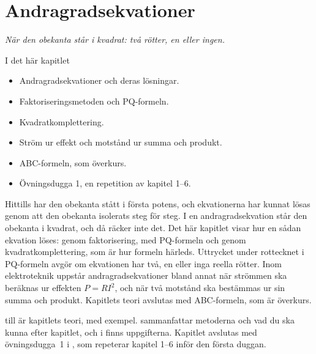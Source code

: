 
\chapter{Andragradsekvationer}
\label{c6:ch}

{\large\itshape När den obekanta står i kvadrat: två rötter, en eller ingen.\par}

\begin{chapterbox}{I det här kapitlet}
\begin{itemize}
  \item Andragradsekvationer och deras lösningar.
  \item Faktoriseringsmetoden och PQ-formeln.
  \item Kvadratkomplettering.
  \item Ström ur effekt och motstånd ur summa och produkt.
  \item ABC-formeln, som överkurs.
  \item Övningsdugga 1, en repetition av kapitel 1--6.
\end{itemize}
\end{chapterbox}

Hittills har den obekanta stått i första potens, och ekvationerna har kunnat lösas genom att
den obekanta isolerats steg för steg. I en andragradsekvation står den obekanta i kvadrat, och då
räcker inte det. Det här kapitlet visar hur en sådan ekvation löses: genom faktorisering, med
PQ-formeln och genom kvadratkomplettering, som är hur formeln härleds. Uttrycket under rottecknet i
PQ-formeln avgör om ekvationen har två, en eller inga reella rötter. Inom elektroteknik uppstår
andragradsekvationer bland annat när strömmen ska beräknas ur effekten $P = RI^2$, och när två
motstånd ska bestämmas ur sin summa och produkt. Kapitlets teori avslutas med ABC-formeln, som är
överkurs.

 till  är kapitlets teori, med exempel.
 sammanfattar metoderna och vad du ska kunna efter kapitlet, och i
 finns uppgifterna. Kapitlet avslutas med övningsdugga~1 i
, som repeterar kapitel 1--6 inför den första duggan.





